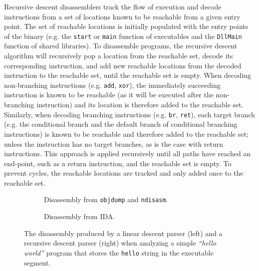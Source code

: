 Recursive descent disassemblers track the flow of execution and decode instructions from a set of locations known to be reachable from a given entry point. The set of reachable locations is initially populated with the entry points of the binary (e.g. the \texttt{start} or \texttt{main} function of executables and the \texttt{DllMain} function of shared libraries). To disassemble programs, the recursive descent algorithm will recursively pop a location from the reachable set, decode its corresponding instruction, and add new reachable locations from the decoded instruction to the reachable set, until the reachable set is empty. When decoding non-branching instructions (e.g. \texttt{add}, \texttt{xor}), the immediately succeeding instruction is known to be reachable (as it will be executed after the non-branching instruction) and its location is therefore added to the reachable set. Similarly, when decoding branching instructions (e.g. \texttt{br}, \texttt{ret}), each target branch (e.g. the conditional branch and the default branch of conditional branching instructions) is known to be reachable and therefore added to the reachable set; unless the instruction has no target branches, as is the case with return instructions. This approach is applied recursively until all paths have reached an end-point, such as a return instruction, and the reachable set is empty. To prevent cycles, the reachable locations are tracked and only added once to the reachable set.

\begin{figure}[htbp]
	\centering
	\begin{subfigure}[t]{0.49\textwidth}
		
		\caption{Disassembly from \texttt{objdump} and \texttt{ndisasm}\protect\footnotemark.}
	\end{subfigure}
	\qquad
	\begin{subfigure}[t]{0.35\textwidth}
		
		\caption{Disassembly from IDA.}
	\end{subfigure}
	\caption{The disassembly produced by a linear descent parser (left) and a recursive descent parser (right) when analyzing a simple \textit{``hello world''} program that stores the \texttt{hello} string in the executable segment.}
	\label{fig:comparison_between_linear_and_recursive_descent}
\end{figure}

